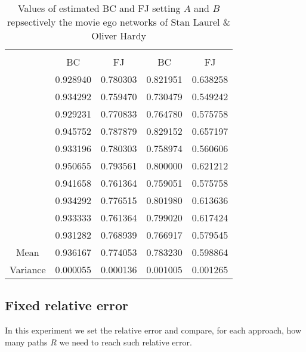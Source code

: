 		 \begin{table}[h]
		 	\centering
		 	\begin{tabular}{l|l|l|l|l|}
		 		\cline{2-5}
		 		&\multicolumn{2}{c|}{\fsamp} & \multicolumn{2}{c|}{\base}\\
		 		\cline{2-5}
		 		& \multicolumn{1}{c|}{BC} & \multicolumn{1}{c|}{FJ} & \multicolumn{1}{c|}{BC} & \multicolumn{1}{c|}{FJ}\\
		 		\cline{2-5}
		 		& 0.928940 & 0.780303 &  0.821951 & 0.638258\\
		 		& 0.934292 & 0.759470 &  0.730479 & 0.549242\\
		 		& 0.929231 & 0.770833 &  0.764780 & 0.575758\\
		 		& 0.945752 & 0.787879 &  0.829152 & 0.657197\\
		 		& 0.933196 & 0.780303 &  0.758974 & 0.560606\\
		 		& 0.950655 & 0.793561 &  0.800000 & 0.621212\\
		 		& 0.941658 & 0.761364 &  0.759051 & 0.575758\\
		 		& 0.934292 & 0.776515 &  0.801980 & 0.613636\\
		 		& 0.933333 & 0.761364 &  0.799020 & 0.617424\\
		 		& 0.931282 & 0.768939 &  0.766917 & 0.579545\\
		 		\hline
		 		\multicolumn{1}{|c|}{Mean} & 0.936167 & 0.774053 & 0.783230 & 0.598864\\
		 		\multicolumn{1}{|c|}{Variance} & 0.000055 & 0.000136 & 0.001005 & 0.001265\\
		 		\hline  %
		 	\end{tabular}
		 	\caption{Values of estimated BC and FJ setting $A$ and $B$ repsectively the movie ego networks of Stan Laurel \& Oliver Hardy }
		 	\label{table:stanlio}
		 \end{table}
	\subsection*{Fixed relative error}
	
	In this experiment we set the relative error and compare, for each approach, how many paths $R$ we need to reach such relative error.\\
	
